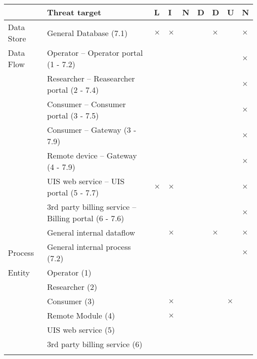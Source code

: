 

\begin{longtable}{p{2.3cm} p{9cm} p{0.2cm} p{0.2cm} p{0.2cm} p{0.2cm}p{0.2cm} p{0.2cm} p{0.2cm} }
\hline\hline
& Threat target & L & I & N & D & D & U & N \\
\hline
Data Store &  General Database (7.1) & $\times$ & $\times$ & & & $\times$ & & $\times$ \\
\hline
Data Flow  &  Operator -- Operator portal (1 - 7.2) & & & & & & & $\times$\\
		   &  Researcher -- Reasearcher portal (2 - 7.4) & & & & & & & $\times$\\
		   &  Consumer -- Consumer portal (3 - 7.5) & & & & & & & $\times$\\
		   &  Consumer -- Gateway (3 - 7.9) & & & & & & & $\times$\\
		   &  Remote device -- Gateway (4 - 7.9) & & & & & & & $\times$\\
		   &  UIS web service -- UIS portal (5 - 7.7) & $\times$ & $\times$ & & & & & $\times$\\
		   &  3rd party billing service -- Billing portal (6 - 7.6) & & & & & & & $\times$\\
		   &  General internal dataflow & & $\times$ & & & $\times$ & & $\times$\\
\hline
Process & General internal process (7.2) & & & & & & & $\times$\\
\hline
Entity 	& Operator (1) & &  & & &  & & \\
	& Researcher (2) & &  & & &  & & \\
	& Consumer (3) & & $\times$ & & &  & $\times$ & \\
	& Remote Module (4) & & $\times$ & & & & & \\
	& UIS web service (5) & & & & & & & \\
	& 3rd party billing service (6) & & & & & & & \\
\hline\hline
\caption{ \label{table:LINDDUN_final_mapping_MUCs}}
\end{longtable}

